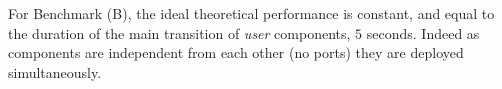 


For Benchmark (B), the ideal theoretical performance is constant, and
equal to the duration of the main transition of \emph{user}
components, \ie $5$ seconds. Indeed as components are independent from
each other (no ports) they are deployed simultaneously.


